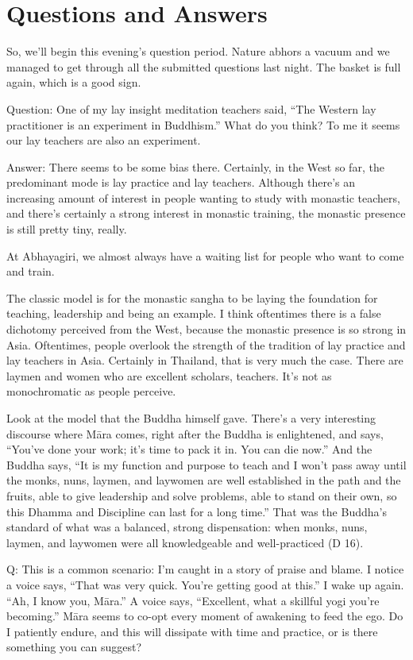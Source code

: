 \chapter{Questions and Answers}

So, we’ll begin this evening’s question period. Nature abhors a vacuum
and we managed to get through all the submitted questions last night.
The basket is full again, which is a good sign.

\qaspace
Question: One of my lay insight meditation teachers said, “The Western
lay practitioner is an experiment in Buddhism.” What do you think? To me
it seems our lay teachers are also an experiment.

\qaspace
Answer: There seems to be some bias there. Certainly, in the West so
far, the predominant mode is lay practice and lay teachers. Although
there’s an increasing amount of interest in people wanting to study with
monastic teachers, and there’s certainly a strong interest in monastic
training, the monastic presence is still pretty tiny, really.

At Abhayagiri, we almost always have a waiting list for people who want
to come and train.

The classic model is for the monastic sangha to be laying the foundation
for teaching, leadership and being an example. I think oftentimes there
is a false dichotomy perceived from the West, because the monastic
presence is so strong in Asia. Oftentimes, people overlook the strength
of the tradition of lay practice and lay teachers in Asia. Certainly in
Thailand, that is very much the case. There are laymen and women who are
excellent scholars, teachers. It’s not as monochromatic as people
perceive.

Look at the model that the Buddha himself gave. There’s a very
interesting discourse where Māra comes, right after the Buddha is
enlightened, and says, “You’ve done your work; it's time to pack it in.
You can die now.” And the Buddha says, “It is my function and purpose to
teach and I won’t pass away until the monks, nuns, laymen, and laywomen
are well established in the path and the fruits, able to give leadership
and solve problems, able to stand on their own, so this Dhamma and
Discipline can last for a long time.” That was the Buddha’s standard of
what was a balanced, strong dispensation: when monks, nuns, laymen, and
laywomen were all knowledgeable and well-practiced (D 16).

\qaspace
Q: This is a common scenario: I’m caught in a story of praise and blame.
I notice a voice says, “That was very quick. You’re getting good at
this.” I wake up again. “Ah, I know you, Māra.” A voice says,
“Excellent, what a skillful yogi you’re becoming.” Māra seems to co-opt
every moment of awakening to feed the ego. Do I patiently endure, and
this will dissipate with time and practice, or is there something you
can suggest?

